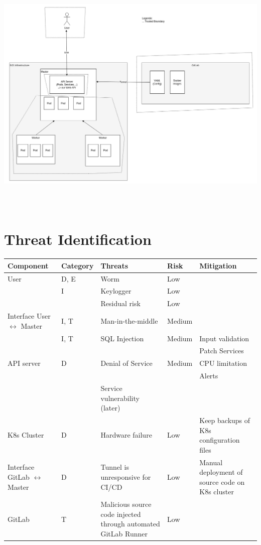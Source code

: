 \includegraphics[height=12cm]{resources/architecture_threat_model.png}


\section{Threat Identification}

\begin{tabular*}{\textwidth}{p{2.1cm} p{1.8cm} p{3cm} p{2cm} p{3.5cm}}
    \textbf{Component} & \textbf{Category} & \textbf{Threats} & \textbf{Risk} & \textbf{Mitigation} \\
    \hline
    User                & D, E & Worm & Low & \\
                        & I & Keylogger & Low & \\
                        & & Residual risk & Low & \\
    \hline
    Interface User \(\leftrightarrow\) Master   & I, T & Man-in-the-middle & Medium & \\
                            & I, T & SQL Injection & Medium & Input validation \\
                            & & & & Patch Services \\
    \hline
    API server          & D & Denial of Service & Medium & CPU limitation \\
                        & & & & Alerts \\
                        & & Service vulnerability (later) & & \\
    \hline
    K8s Cluster             & D & Hardware failure & Low & Keep backups of K8s configuration files \\
    \hline
    Interface GitLab \(\leftrightarrow\) Master & D & Tunnel is unresponsive for CI/CD & Low & Manual deployment of source code on K8s cluster \\
    \hline
    GitLab             & T & Malicious source code injected through automated GitLab Runner & Low & \\ 
    \hline
\end{tabular*}


